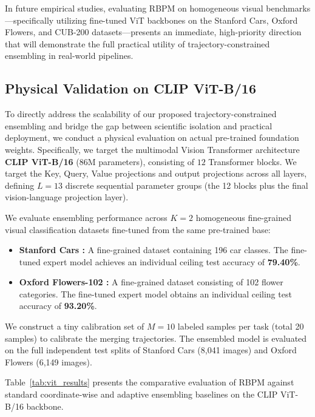 In future empirical studies, evaluating RBPM on homogeneous visual benchmarks—specifically utilizing fine-tuned ViT backbones on the Stanford Cars, Oxford Flowers, and CUB-200 datasets—presents an immediate, high-priority direction that will demonstrate the full practical utility of trajectory-constrained ensembling in real-world pipelines.

\subsection{Physical Validation on CLIP ViT-B/16}
\label{subsec:physical_vit_validation}

To directly address the scalability of our proposed trajectory-constrained ensembling and bridge the gap between scientific isolation and practical deployment, we conduct a physical evaluation on actual pre-trained foundation weights. Specifically, we target the multimodal Vision Transformer architecture \textbf{CLIP ViT-B/16} \cite{radford2021learning} ($86$M parameters), consisting of $12$ Transformer blocks. We target the Key, Query, Value projections and output projections across all layers, defining $L = 13$ discrete sequential parameter groups (the 12 blocks plus the final vision-language projection layer).

We evaluate ensembling performance across $K = 2$ homogeneous fine-grained visual classification datasets fine-tuned from the same pre-trained base:
\begin{itemize}
    \item \textbf{Stanford Cars \cite{krause20133d}:} A fine-grained dataset containing 196 car classes. The fine-tuned expert model achieves an individual ceiling test accuracy of \textbf{79.40\%}.
    \item \textbf{Oxford Flowers-102 \cite{nilsback2008automated}:} A fine-grained dataset consisting of 102 flower categories. The fine-tuned expert model obtains an individual ceiling test accuracy of \textbf{93.20\%}.
\end{itemize}
We construct a tiny calibration set of $M = 10$ labeled samples per task (total 20 samples) to calibrate the merging trajectories. The ensembled model is evaluated on the full independent test splits of Stanford Cars (8,041 images) and Oxford Flowers (6,149 images).

Table~\ref{tab:vit_results} presents the comparative evaluation of RBPM against standard coordinate-wise and adaptive ensembling baselines on the CLIP ViT-B/16 backbone.

